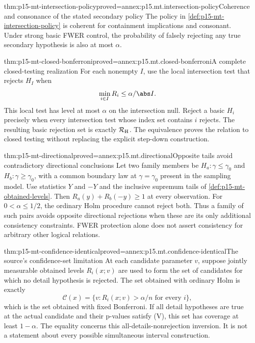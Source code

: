 \begin{hblemma}{thm:p15-mt-intersection-policy}{proved=annex:p15.mt.intersection-policy}{Coherence and consonance of the stated secondary policy}
The policy in \cref{def:p15-mt-intersection-policy} is coherent for
containment implications and consonant. Under strong basic FWER control,
the probability of falsely rejecting any true secondary hypothesis is
also at most \(\alpha\).
\end{hblemma}

\begin{hbtheorem}{thm:p15-mt-closed-bonferroni}{proved=annex:p15.mt.closed-bonferroni}{A complete closed-testing realization}
For each nonempty \(I\), use the local intersection test that rejects
\(H_I\) when
\[
                         \min_{i\in I}R_i\leq\alpha/\abs I.
\]
This local test has level at most \(\alpha\) on the intersection null.
Reject a basic \(H_i\) precisely when every intersection test whose index
set contains \(i\) rejects. The resulting basic rejection set is exactly
\(\mathcal R_{\rm H}\). The equivalence proves the relation to closed
testing without replacing the explicit step-down construction.
\end{hbtheorem}

\begin{hblemma}{thm:p15-mt-directional}{proved=annex:p15.mt.directional}{Opposite tails avoid contradictory directional conclusions}
Let two family members be \(H_a:\gamma\leq\gamma_0\) and
\(H_b:\gamma\geq\gamma_0\), with a common boundary law
at \(\gamma=\gamma_0\) present in the sampling model.
Use statistics \(Y\) and \(-Y\) and the
inclusive supremum tails of \cref{def:p15-mt-obtained-levels}.
Then \(R_a(y)+R_b(-y)\geq1\) at every observation.
For \(0<\alpha\leq1/2\), the ordinary Holm procedure cannot reject both.
Thus a family of such pairs avoids opposite directional rejections when
these are its only additional consistency constraints.
FWER protection alone does not assert consistency for arbitrary other
logical relations.
\end{hblemma}

\begin{hblemma}{thm:p15-mt-confidence-identical}{proved=annex:p15.mt.confidence-identical}{The source's confidence-set limitation}
At each candidate parameter \(v\), suppose jointly measurable obtained
levels \(R_i(x;v)\) are used to form the set of candidates for which
no detail hypothesis is rejected. The set obtained with ordinary Holm
is exactly
\[
 \mathcal C(x)=\{v:R_i(x;v)>\alpha/n\text{ for every }i\},
\]
which is the set obtained with fixed Bonferroni.
If all detail hypotheses are true at the actual candidate and their
p-values satisfy (V), this set has coverage at least \(1-\alpha\).
The equality concerns this all-details-nonrejection inversion. It is
not a statement about every possible simultaneous interval construction.
\end{hblemma}

